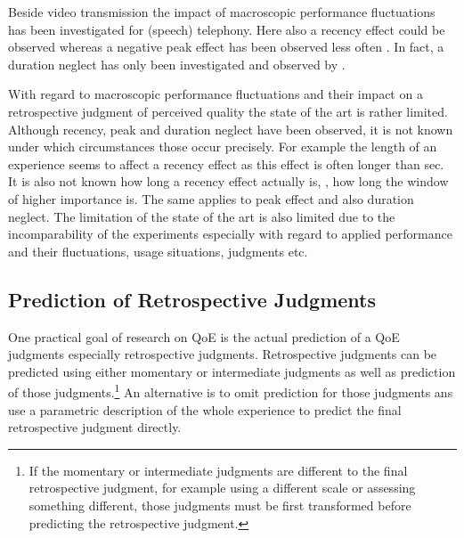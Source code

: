 Beside video transmission the impact of macroscopic performance fluctuations has been investigated for (speech) telephony. %
Here also a recency effect could be observed \citep[\cf,][]{rosenbluth_testing_1998, hamberg_time-varying_1999, gros_instantaneous_2001, gros_effects_2004, belmudez_assessment_2014, weiss_modeling_2009, lewcio_management_2012} whereas a negative peak effect has been observed less often \citep{weiss_modeling_2009, belmudez_assessment_2014, lewcio_management_2012}.
In fact, a duration neglect has only been investigated and observed by \citet{rosenbluth_testing_1998}.

With regard to macroscopic performance fluctuations and their impact on a retrospective judgment of perceived quality the state of the art is rather limited.
Although recency, peak and duration neglect have been observed, it is not known under which circumstances those occur precisely.
For example the length of an experience seems to affect a recency effect as this effect is often longer than \unit[30]{sec}.
It is also not known how long a recency effect actually is, \ie, how long the window of higher importance is.
The same applies to peak effect and also duration neglect.
The limitation of the state of the art is also limited due to the incomparability of the experiments especially with regard to applied performance and their fluctuations, usage situations, judgments etc.


\subsection{Prediction of Retrospective Judgments}
One practical goal of research on \ac{QoE} is the actual prediction of a \ac{QoE} judgments especially retrospective judgments.
Retrospective judgments can be predicted using either momentary or intermediate judgments as well as prediction of those judgments.\footnote{If the momentary or intermediate judgments are different to the final retrospective judgment, for example using a different scale or assessing something different, those judgments must be first transformed before predicting the retrospective judgment.}
An alternative is to omit prediction for those judgments ans use a parametric description of the whole experience to predict the final retrospective judgment directly.

